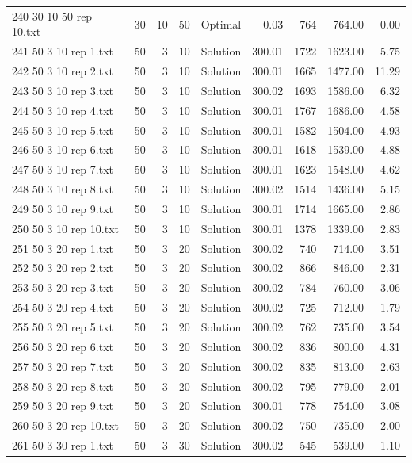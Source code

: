 \begin{longtable}{lrrllrrrr}
240 30 10 50 rep 10.txt & 30 & 10 & 50 & Optimal &  0.03 & 764 & 764.00 &  0.00\\
241 50 3 10 rep 1.txt & 50 & 3 & 10 & Solution & 300.01 & 1722 & 1623.00 &  5.75\\
242 50 3 10 rep 2.txt & 50 & 3 & 10 & Solution & 300.01 & 1665 & 1477.00 & 11.29\\
243 50 3 10 rep 3.txt & 50 & 3 & 10 & Solution & 300.02 & 1693 & 1586.00 &  6.32\\
244 50 3 10 rep 4.txt & 50 & 3 & 10 & Solution & 300.01 & 1767 & 1686.00 &  4.58\\
245 50 3 10 rep 5.txt & 50 & 3 & 10 & Solution & 300.01 & 1582 & 1504.00 &  4.93\\
246 50 3 10 rep 6.txt & 50 & 3 & 10 & Solution & 300.01 & 1618 & 1539.00 &  4.88\\
247 50 3 10 rep 7.txt & 50 & 3 & 10 & Solution & 300.01 & 1623 & 1548.00 &  4.62\\
248 50 3 10 rep 8.txt & 50 & 3 & 10 & Solution & 300.02 & 1514 & 1436.00 &  5.15\\
249 50 3 10 rep 9.txt & 50 & 3 & 10 & Solution & 300.01 & 1714 & 1665.00 &  2.86\\
250 50 3 10 rep 10.txt & 50 & 3 & 10 & Solution & 300.01 & 1378 & 1339.00 &  2.83\\
251 50 3 20 rep 1.txt & 50 & 3 & 20 & Solution & 300.02 & 740 & 714.00 &  3.51\\
252 50 3 20 rep 2.txt & 50 & 3 & 20 & Solution & 300.02 & 866 & 846.00 &  2.31\\
253 50 3 20 rep 3.txt & 50 & 3 & 20 & Solution & 300.02 & 784 & 760.00 &  3.06\\
254 50 3 20 rep 4.txt & 50 & 3 & 20 & Solution & 300.02 & 725 & 712.00 &  1.79\\
255 50 3 20 rep 5.txt & 50 & 3 & 20 & Solution & 300.02 & 762 & 735.00 &  3.54\\
256 50 3 20 rep 6.txt & 50 & 3 & 20 & Solution & 300.02 & 836 & 800.00 &  4.31\\
257 50 3 20 rep 7.txt & 50 & 3 & 20 & Solution & 300.02 & 835 & 813.00 &  2.63\\
258 50 3 20 rep 8.txt & 50 & 3 & 20 & Solution & 300.02 & 795 & 779.00 &  2.01\\
259 50 3 20 rep 9.txt & 50 & 3 & 20 & Solution & 300.01 & 778 & 754.00 &  3.08\\
260 50 3 20 rep 10.txt & 50 & 3 & 20 & Solution & 300.02 & 750 & 735.00 &  2.00\\
261 50 3 30 rep 1.txt & 50 & 3 & 30 & Solution & 300.02 & 545 & 539.00 &  1.10\\

\end{longtable}
